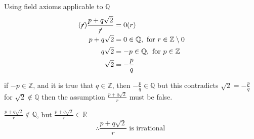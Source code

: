 \documentclass{article}
\begin{document}
\begin{enumerate}[start = 8, label = {\bfseries Problem \arabic*:}, leftmargin=1in]
    Using field axioms applicable to \(\mathbb{Q}\)
    \begin{align*}
        (\cancel{r})\frac{p + q\sqrt{2}}{\cancel{r}} &= 0 (r) \\
        p + q\sqrt{2} &= 0 \in \mathbb{Q}, \text{ for } r \in \mathbb{Z} \setminus 0 \\
        q\sqrt{2} &= -p \in \mathbb{Q}, \text{ for } p \in \mathbb{Z} \\
        \sqrt{2} &= -\frac{p}{q}
    \end{align*}

    if \(-p \in \mathbb{Z}\), and it is true that \(q \in \mathbb{Z}\), then \(-\frac{p}{q} \in \mathbb{Q}\) but this 
    contradicts \(\sqrt{2} = - \frac{p}{q}\) for \(\sqrt{2} \notin \mathbb{Q}\) then the assumption \(\frac{p + q\sqrt{2}}{r}\) must be false.

    \(\frac{p+q\sqrt{2}}{r} \notin \mathbb{Q}\), but \(\frac{p+q\sqrt{2}}{r} \in \mathbb{R}\)
    \[
        \therefore \frac{p+q\sqrt{2}}{r} \text{ is irrational } 
    \]
\end{enumerate}
\end{document}
